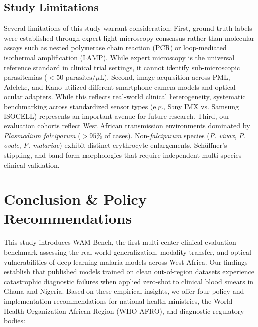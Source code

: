 \documentclass[a4paper,11pt]{article}
\begin{document}
\subsection{Study Limitations}
Several limitations of this study warrant consideration:
First, ground-truth labels were established through expert light microscopy consensus rather than molecular assays such as nested polymerase chain reaction (PCR) or loop-mediated isothermal amplification (LAMP). While expert microscopy is the universal reference standard in clinical trial settings, it cannot identify sub-microscopic parasitemias ($<50\text{ parasites}/\mu\text{L}$).
Second, image acquisition across PML, Adeleke, and Kano utilized different smartphone camera models and optical ocular adapters. While this reflects real-world clinical heterogeneity, systematic benchmarking across standardized sensor types (e.g., Sony IMX vs. Samsung ISOCELL) represents an important avenue for future research.
Third, our evaluation cohorts reflect West African transmission environments dominated by \textit{Plasmodium falciparum} ($>95\%$ of cases). Non-\textit{falciparum} species (\textit{P. vivax}, \textit{P. ovale}, \textit{P. malariae}) exhibit distinct erythrocyte enlargements, Schüffner's stippling, and band-form morphologies that require independent multi-species clinical validation.

\section{Conclusion \& Policy Recommendations}
\label{sec:conclusion}

This study introduces WAM-Bench, the first multi-center clinical evaluation benchmark assessing the real-world generalization, modality transfer, and optical vulnerabilities of deep learning malaria models across West Africa. Our findings establish that published models trained on clean out-of-region datasets experience catastrophic diagnostic failures when applied zero-shot to clinical blood smears in Ghana and Nigeria. Based on these empirical insights, we offer four policy and implementation recommendations for national health ministries, the World Health Organization African Region (WHO AFRO), and diagnostic regulatory bodies:
\end{document}
